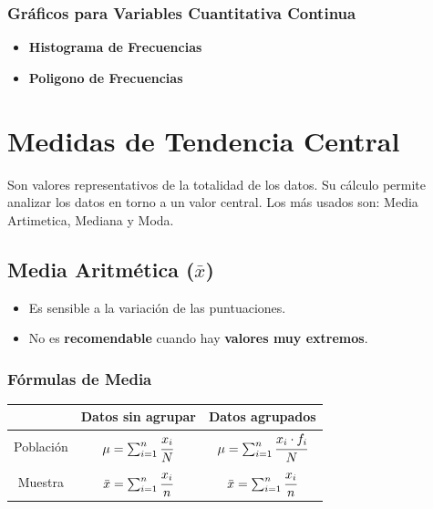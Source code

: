 \documentclass{article}
\begin{document}
            \subsubsection*{Gráficos para Variables Cuantitativa Continua}
                \begin{itemize}
                    \item\textbf{Histograma de Frecuencias} 
                    \item \textbf{Poligono de Frecuencias} 
                \end{itemize}

\section{Medidas de Tendencia Central}    
    Son valores representativos de la totalidad de los datos. Su cálculo permite analizar los datos en torno a un valor central.
    Los más usados son: Media Artimetica, Mediana y Moda.
    \subsection{Media Aritmética (\texorpdfstring{$\bar{x}$}{x-bar})}
        \begin{itemize}
            \item Es sensible a la variación de las puntuaciones.
            \item No es \textbf{recomendable} cuando hay \textbf{valores muy extremos}.
        \end{itemize}
        \subsubsection{Fórmulas de Media}
            \begin{table}[H]
                \centering
                \begin{tabular}{|c|c|c|}
                    \hline
                    &Datos sin agrupar&Datos agrupados \\ \hline
                    Población& $\mu = \sum_{i=1}^{n}\cfrac{x_i}{N}$&$\mu = \sum_{i=1}^{n}\cfrac{x_i\cdot f_i}{N}$ \\ \hline
                    Muestra & $\bar{x} = \sum_{i=1}^{n}\cfrac{x_i}{n}$ & $\bar{x} = \sum_{i=1}^{n}\cfrac{x_i}{n}$ \\ \hline
                \end{tabular}
            \end{table}
\end{document}
